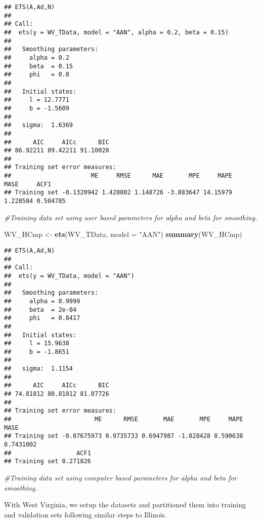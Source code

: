 \documentclass[
]{article}
\newenvironment{Shaded}{\begin{snugshade}}{\end{snugshade}}
\newcommand{\CommentTok}[1]{\textcolor[rgb]{0.56,0.35,0.01}{\textit{#1}}}
\newcommand{\DataTypeTok}[1]{\textcolor[rgb]{0.13,0.29,0.53}{#1}}
\newcommand{\KeywordTok}[1]{\textcolor[rgb]{0.13,0.29,0.53}{\textbf{#1}}}
\newcommand{\NormalTok}[1]{#1}
\newcommand{\StringTok}[1]{\textcolor[rgb]{0.31,0.60,0.02}{#1}}
\begin{document}
\begin{verbatim}
## ETS(A,Ad,N) 
## 
## Call:
##  ets(y = WV_TData, model = "AAN", alpha = 0.2, beta = 0.15) 
## 
##   Smoothing parameters:
##     alpha = 0.2 
##     beta  = 0.15 
##     phi   = 0.8 
## 
##   Initial states:
##     l = 12.7771 
##     b = -1.5609 
## 
##   sigma:  1.6369
## 
##      AIC     AICc      BIC 
## 86.92211 89.42211 91.10020 
## 
## Training set error measures:
##                      ME     RMSE      MAE       MPE     MAPE     MASE     ACF1
## Training set -0.1320942 1.428802 1.148726 -3.883647 14.15979 1.228584 0.504785
\end{verbatim}

\begin{Shaded}
\begin{Highlighting}[]
\CommentTok{#Training data set using user based parameters for alpha and beta for smoothing.}
\end{Highlighting}
\end{Shaded}

\begin{Shaded}
\begin{Highlighting}[]
\NormalTok{WV_HCmp <-}\StringTok{ }\KeywordTok{ets}\NormalTok{(WV_TData, }\DataTypeTok{model =} \StringTok{"AAN"}\NormalTok{)}
\KeywordTok{summary}\NormalTok{(WV_HCmp)}
\end{Highlighting}
\end{Shaded}

\begin{verbatim}
## ETS(A,Ad,N) 
## 
## Call:
##  ets(y = WV_TData, model = "AAN") 
## 
##   Smoothing parameters:
##     alpha = 0.9999 
##     beta  = 2e-04 
##     phi   = 0.8417 
## 
##   Initial states:
##     l = 15.9638 
##     b = -1.8651 
## 
##   sigma:  1.1154
## 
##      AIC     AICc      BIC 
## 74.81012 80.81012 81.07726 
## 
## Training set error measures:
##                       ME      RMSE       MAE       MPE     MAPE      MASE
## Training set -0.07675973 0.9735733 0.6947987 -1.828428 8.590638 0.7431002
##                  ACF1
## Training set 0.271826
\end{verbatim}

\begin{Shaded}
\begin{Highlighting}[]
\CommentTok{#Training data set using computer based parameters for alpha and beta for smoothing.}
\end{Highlighting}
\end{Shaded}

With West Virginia, we setup the datasets and partitioned them into
training and validation sets following similar steps to Illinois.
\end{document}

